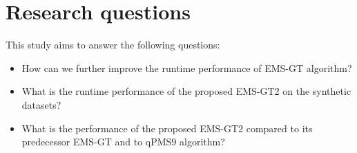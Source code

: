 \section{Research questions}

This study aims to answer the following questions:

\begin{itemize}
	\item How can we further improve the runtime performance of EMS-GT algorithm?

	\item What is the runtime performance of the proposed EMS-GT2 on the synthetic datasets?

	\item What is the performance of the proposed EMS-GT2 compared to its predecessor EMS-GT and to qPMS9 algorithm?	
\end{itemize}